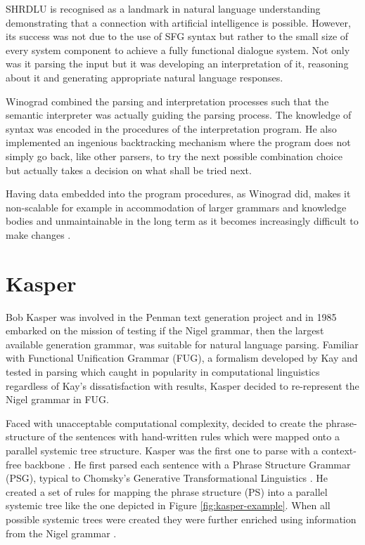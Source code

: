    SHRDLU is recognised as a landmark in natural language understanding demonstrating that a connection with artificial intelligence is possible. However, its success was not due to the use of SFG syntax but rather to the small size of every system component to achieve a fully functional dialogue system. Not only was it parsing the input but it was developing an interpretation of it, reasoning about it and generating appropriate natural language responses. 
    
    Winograd combined the parsing and interpretation processes such that the semantic interpreter was actually guiding the parsing process. The knowledge of syntax was encoded in the procedures of the interpretation program. He also implemented an ingenious backtracking mechanism where the program does not simply go back, like other parsers, to try the next possible combination choice but actually takes a decision on what shall be tried next.  
    
    Having data embedded into the program procedures, as Winograd did, makes it non-scalable for example in accommodation of larger grammars and knowledge bodies and unmaintainable in the long term as it becomes increasingly difficult to make changes \citep{Weerasinghe1994}.

\section{Kasper}
    Bob Kasper was involved in the Penman text generation project and in 1985 embarked on the mission of testing if the Nigel grammar, then the largest available generation grammar, was suitable for natural language parsing. Familiar with Functional Unification Grammar (FUG), a formalism developed by Kay and tested in parsing \citep{Kay1985} which caught in popularity in computational linguistics regardless of Kay's dissatisfaction with results, Kasper decided to re-represent the Nigel grammar in FUG. 
    
    Faced with unacceptable computational complexity, \citet{Kasper1988} decided to create the phrase-structure of the sentences with hand-written rules which were mapped onto a parallel systemic tree structure. Kasper was the first one to parse with a context-free backbone \citep{Kasper1988}. He first parsed each sentence with a Phrase Structure Grammar (PSG), typical to Chomsky's Generative Transformational Linguistics \citep{Chomsky57}. He created a set of rules for mapping the phrase structure (PS) into a parallel systemic tree like the one depicted in Figure \ref{fig:kasper-example}. When all possible systemic trees were created they were further enriched using information from the Nigel grammar \citep{Matthiessen1985}.

